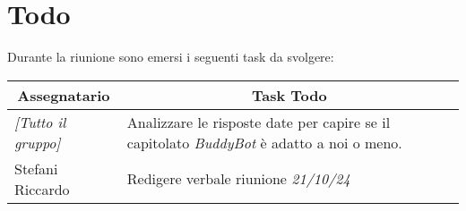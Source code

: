 \section{Todo}

Durante la riunione sono emersi i seguenti task da svolgere:

\vspace{0.5cm}

\begin{table}[htbp]
\begin{tabular}{|p{}|p{}|}
    \hline
    \multicolumn{1}{|c|}{\textbf{Assegnatario}} & \multicolumn{1}{|c|}{\textbf{Task Todo}} \\
    \hline
    \emph{[Tutto il gruppo]} & Analizzare le risposte date per capire se il capitolato \emph{BuddyBot} è adatto a noi o meno. \\
    \hline
    Stefani Riccardo & Redigere verbale riunione \emph{21/10/24} \\
    \hline
\end{tabular}
\end{table}